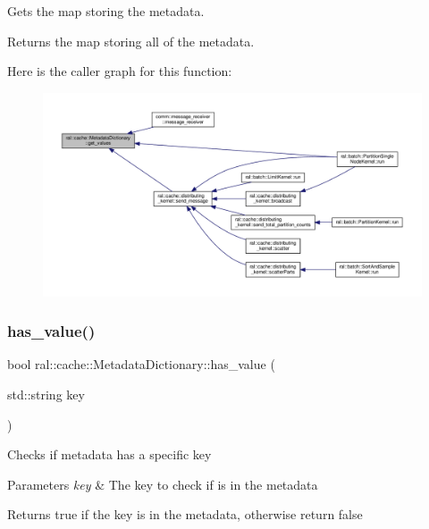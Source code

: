 Gets the map storing the metadata. \begin{DoxyReturn}{Returns}
the map storing all of the metadata. 
\end{DoxyReturn}
Here is the caller graph for this function\+:\nopagebreak
\begin{figure}[H]
\begin{center}
\leavevmode
\includegraphics[width=350pt]{classral_1_1cache_1_1MetadataDictionary_abdc2863d96dc839565f2078471f4c9f7_icgraph}
\end{center}
\end{figure}
\mbox{\label{classral_1_1cache_1_1MetadataDictionary_a72ac4462583a2be4be3de19eb230b624}} 
\subsubsection{\texorpdfstring{has\+\_\+value()}{has\_value()}}
{\footnotesize\ttfamily bool ral\+::cache\+::\+Metadata\+Dictionary\+::has\+\_\+value (\begin{DoxyParamCaption}\item[{std\+::string}]{key }\end{DoxyParamCaption})\hspace{0.3cm}{\ttfamily [inline]}}

Checks if metadata has a specific key 
\begin{DoxyParams}{Parameters}
{\em key} & The key to check if is in the metadata \\
\hline
\end{DoxyParams}
\begin{DoxyReturn}{Returns}
true if the key is in the metadata, otherwise return false 
\end{DoxyReturn}
\mbox{\label{classral_1_1cache_1_1MetadataDictionary_a762943ae80571c2f5ea6dfbcea07a3bb}} 
